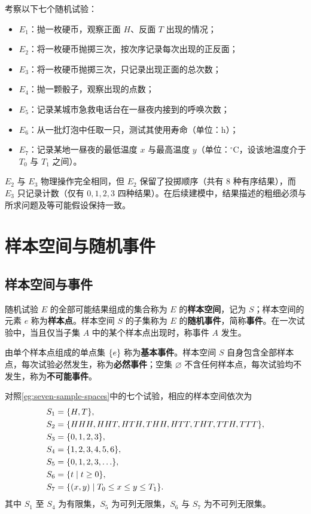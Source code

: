 \begin{example}[title={若干典型随机试验}]
\label{eg:seven-sample-spaces}
考察以下七个随机试验：
\begin{itemize}
  \item $E_1$：抛一枚硬币，观察正面 $H$、反面 $T$ 出现的情况；
  \item $E_2$：将一枚硬币抛掷三次，按次序记录每次出现的正反面；
  \item $E_3$：将一枚硬币抛掷三次，只记录出现正面的总次数；
  \item $E_4$：抛一颗骰子，观察出现的点数；
  \item $E_5$：记录某城市急救电话台在一昼夜内接到的呼唤次数；
  \item $E_6$：从一批灯泡中任取一只，测试其使用寿命（单位：$\mathrm{h}$）；
  \item $E_7$：记录某地一昼夜的最低温度 $x$ 与最高温度 $y$（单位：$^\circ\mathrm{C}$，设该地温度介于 $T_0$ 与 $T_1$ 之间）。
\end{itemize}
$E_2$ 与 $E_3$ 物理操作完全相同，但 $E_2$ 保留了投掷顺序（共有 $8$ 种有序结果），而 $E_3$ 只记录计数（仅有 $0,1,2,3$ 四种结果）。在后续建模中，结果描述的粗细必须与所求问题及等可能假设保持一致。
\end{example}

\section{样本空间与随机事件}
\label{sec:sample-events}

\subsection{样本空间与事件}

\begin{definition}
\label{def:sample-space-event}
随机试验 $E$ 的全部可能结果组成的集合称为 $E$ 的\textbf{样本空间}，记为 $S$；样本空间的元素 $e$ 称为\textbf{样本点}。样本空间 $S$ 的子集称为 $E$ 的\textbf{随机事件}，简称\textbf{事件}。在一次试验中，当且仅当子集 $A$ 中的某个样本点出现时，称事件 $A$ 发生。
\end{definition}

由单个样本点组成的单点集 $\{e\}$ 称为\textbf{基本事件}。样本空间 $S$ 自身包含全部样本点，每次试验必然发生，称为\textbf{必然事件}；空集 $\varnothing$ 不含任何样本点，每次试验均不发生，称为\textbf{不可能事件}。

对照\cref{eg:seven-sample-spaces}中的七个试验，相应的样本空间依次为
\[
\begin{aligned}
  S_1 &= \{H,T\},\\
  S_2 &= \{HHH,HHT,HTH,THH,HTT,THT,TTH,TTT\},\\
  S_3 &= \{0,1,2,3\},\\
  S_4 &= \{1,2,3,4,5,6\},\\
  S_5 &= \{0,1,2,3,\ldots\},\\
  S_6 &= \{t\mid t\ge 0\},\\
  S_7 &= \{(x,y)\mid T_0\le x\le y\le T_1\}.
\end{aligned}
\]
其中 $S_1$ 至 $S_4$ 为有限集，$S_5$ 为可列无限集，$S_6$ 与 $S_7$ 为不可列无限集。

